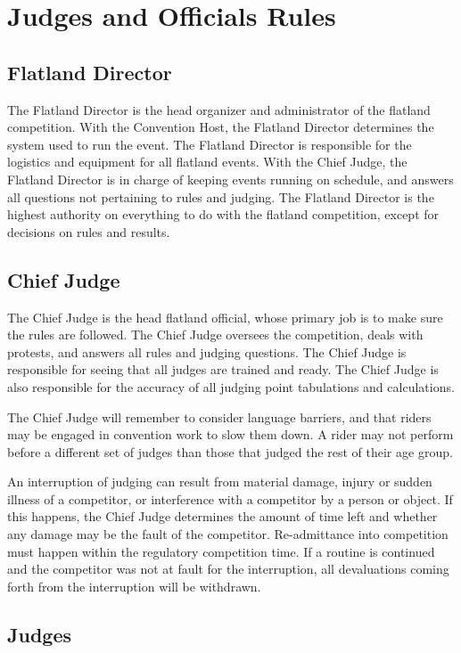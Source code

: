 \chapter{Judges and Officials Rules}

\section{Flatland Director}

The Flatland Director is the head organizer and administrator of the flatland competition.
With the Convention Host, the Flatland Director determines the system used to run the event.
The Flatland Director is responsible for the logistics and equipment for all flatland events.
With the Chief Judge, the Flatland Director is in charge of keeping events running on schedule, and answers all questions not pertaining to rules and judging.
The Flatland Director is the highest authority on everything to do with the flatland competition, except for decisions on rules and results.

\section{Chief Judge}

The Chief Judge is the head flatland official, whose primary job is to make sure the rules are followed.
The Chief Judge oversees the competition, deals with protests, and answers all rules and judging questions.
The Chief Judge is responsible for seeing that all judges are trained and ready.
The Chief Judge is also responsible for the accuracy of all judging point tabulations and calculations.

The Chief Judge will remember to consider language barriers, and that riders may be engaged in convention work to slow them down.
A rider may not perform before a different set of judges than those that judged the rest of their age group.

An interruption of judging can result from material damage, injury or sudden illness of a competitor, or interference with a competitor by a person or object.
If this happens, the Chief Judge determines the amount of time left and whether any damage may be the fault of the competitor.
Re-admittance into competition must happen within the regulatory competition time.
If a routine is continued and the competitor was not at fault for the interruption, all devaluations coming forth from the interruption will be withdrawn.

\section{Judges}


